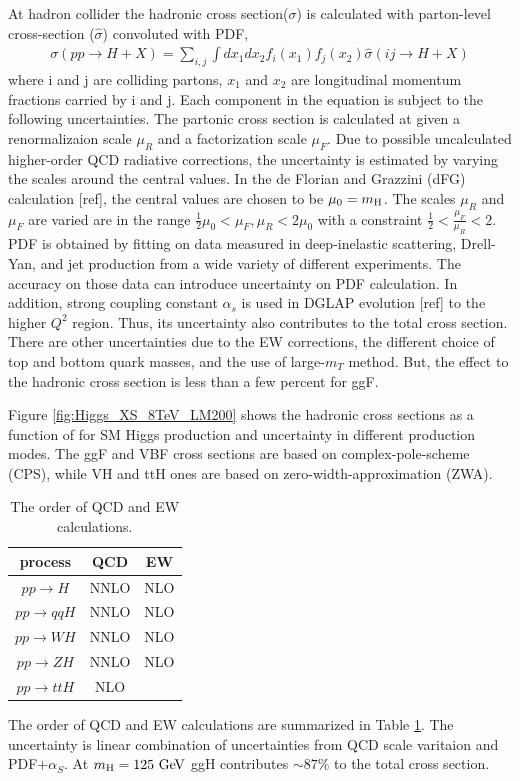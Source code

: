 At hadron collider the hadronic cross section($\sigma$) is calculated with 
parton-level cross-section ($\hat{\sigma}$) convoluted with PDF, 
\begin{eqnarray} 
\sigma (pp \rightarrow H+X) 
= 
\sum_{i,j} \int dx_1 dx_2 f_i(x_1) f_j(x_2) 
\hat{\sigma} \left( ij \rightarrow H+X \right)
\end{eqnarray} 
where i and j are colliding partons, 
$x_1$ and $x_2$ are longitudinal momentum fractions carried by i and j. 
Each component in the equation is subject to the following uncertainties.
The partonic cross section is calculated at given
a renormalizaion scale $\mu_R$ and a factorization scale $\mu_F$. 
Due to possible uncalculated higher-order QCD radiative corrections,
the uncertainty is estimated by varying the scales around 
the central values. In the de Florian and Grazzini (dFG) 
calculation [ref], the central values are chosen to be $\mu_0 = m_{\mathrm{H}}$. 
The scales $\mu_R$ and $\mu_F$ are varied are in the range 
$\displaystyle \frac{1}{2}\mu_0 < \mu_F, \mu_R < 2\mu_0$ 
with a constraint $\displaystyle \frac{1}{2} < \frac{\mu_F}{\mu_R} < 2$. 
PDF is obtained by fitting on data measured in deep-inelastic scattering, 
Drell-Yan, and jet production from a wide variety of different experiments. 
The accuracy on those data can introduce uncertainty on PDF calculation. 
In addition, strong coupling constant $\alpha_s$ is used in DGLAP evolution [ref] 
to the higher $Q^2$ region. Thus, its uncertainty also contributes to 
the total cross section. There are other uncertainties due to 
the EW corrections, the different choice of top and bottom quark masses, 
and the use of large-$m_T$ method. But, the effect to the 
hadronic cross section is less than a few percent \cite{Dittmaier:2012vm}
for ggF.

Figure \ref{fig:Higgs_XS_8TeV_LM200} shows the hadronic cross sections 
as a function of \mHi{} for SM Higgs production and uncertainty 
in different production modes. The ggF and VBF cross sections 
are based on complex-pole-scheme (CPS), while VH and ttH ones 
are based on zero-width-approximation (ZWA). 
\begin{table}[htb]
\centering
\begin{tabular}{c c c  }
\hline
process     & QCD   & EW \\
\hline \hline 
$ pp \rightarrow H$         & NNLO  & NLO \\
$ pp \rightarrow qqH$       & NNLO  & NLO \\
$ pp \rightarrow WH$        & NNLO  & NLO \\
$ pp \rightarrow ZH$        & NNLO  & NLO \\
$ pp \rightarrow ttH$       & NLO   &     \\
\hline 
\end{tabular}
\label{tab:Higgs_XS_8TeV_order}
\caption{The order of QCD and EW calculations.}
\end{table}
The order of QCD and EW calculations are summarized in Table 
\ref{tab:Higgs_XS_8TeV_order}. The uncertainty is linear combination 
of uncertainties from QCD scale varitaion and PDF+$\alpha_S$.
At $m_{\mathrm{H}}=125~\mathrm{Ge\kern -0.1em V}$ ggH contributes $\sim 87 \%$ to the total cross section.


